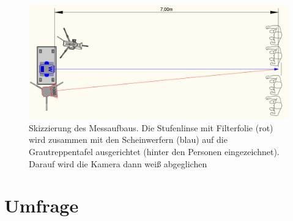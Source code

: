 \begin{figure}[H]     %
\centering
\includegraphics[width=1.0\textwidth]{bilder/aufbaumessung2} 
\caption {Skizzierung des Messaufbaus. Die Stufenlinse mit Filterfolie (rot) wird zusammen mit den Scheinwerfern (blau) auf die Grautreppentafel ausgerichtet (hinter den Personen eingezeichnet). Darauf wird die Kamera dann weiß abgeglichen}\label{b_aufbaumessung2}
\end{figure}



\chapter{Umfrage}

